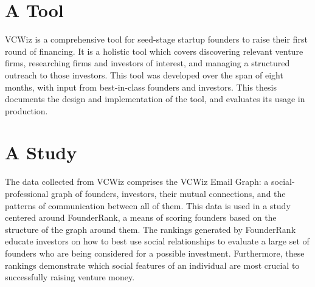 \section{A Tool}

VCWiz is a comprehensive tool for seed-stage startup founders to raise their first round of financing. It is a holistic tool which covers discovering relevant venture firms, researching firms and investors of interest, and managing a structured outreach to those investors. This tool was developed over the span of eight months, with input from best-in-class founders and investors. This thesis documents the design and implementation of the tool, and evaluates its usage in production.

\section{A Study}

The data collected from VCWiz comprises the VCWiz Email Graph: a social-professional graph of founders, investors, their mutual connections, and the patterns of communication between all of them. This data is used in a study centered around FounderRank, a means of scoring founders based on the structure of the graph around them. The rankings generated by FounderRank educate investors on how to best use social relationships to evaluate a large set of founders who are being considered for a possible investment. Furthermore, these rankings demonstrate which social features of an individual are most crucial to successfully raising venture money.
